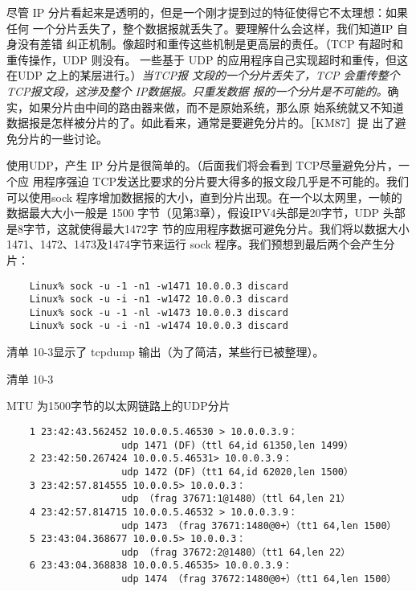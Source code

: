 尽管 IP 分片看起来是透明的，但是一个刚才提到过的特征使得它不太理想：如果任何
一个分片丢失了，整个数据报就丢失了。要理解什么会这样，我们知道IP 自身没有差错
纠正机制。像超时和重传这些机制是更高层的责任。（TCP 有超时和重传操作，UDP 则没有。
一些基于 UDP 的应用程序自己实现超时和重传，但这在UDP 之上的某层进行。）\emph{当TCP报
  文段的一个分片丢失了，TCP 会重传整个 TCP报文段，这涉及整个 IP数据报。只重发数据
报的一个分片是不可能的。}确实，如果分片由中间的路由器来做，而不是原始系统，那么原
始系统就又不知道数据报是怎样被分片的了。如此看来，通常是要避免分片的。［KM87］提
出了避免分片的一些讨论。

使用UDP，产生 IP 分片是很简单的。（后面我们将会看到 TCP尽量避免分片，一个应
用程序强迫 TCP发送比要求的分片要大得多的报文段几乎是不可能的。我们可以使用sock
程序增加数据报的大小，直到分片出现。在一个以太网里，一帧的数据最大大小一般是 1500
字节（见第3章），假设IPV4头部是20字节，UDP 头部是8字节\footnotemark，这就使得最大1472字
节的应用程序数据可避免分片。我们将以数据大小 1471、1472、1473及1474字节来运行
sock 程序。我们预想到最后两个会产生分片：

\begin{verbatim}
    Linux% sock -u -1 -n1 -w1471 10.0.0.3 discard
    Linux% sock -u -i -n1 -w1472 10.0.0.3 discard
    Linux% sock -u -1 -nl -w1473 10.0.0.3 discard
    Linux% sock -u -i -n1 -w1474 10.0.0.3 discard
\end{verbatim}

清单 10-3显示了 tcpdump 输出（为了简洁，某些行已被整理）。

清单 10-3

MTU 为1500字节的以太网链路上的UDP分片

\begin{verbatim}
    1 23:42:43.562452 10.0.0.5.46530 > 10.0.0.3.9：
                    udp 1471 (DF)（ttl 64,id 61350,len 1499）
    2 23:42:50.267424 10.0.0.5.46531> 10.0.0.3.9：
                    udp 1472 (DF)（tt1 64,id 62020,len 1500）
    3 23:42:57.814555 10.0.0.5> 10.0.0.3：
                    udp （frag 37671:1@1480）（ttl 64,len 21）
    4 23:42:57.814715 10.0.0.5.46532 > 10.0.0.3.9：
                    udp 1473 （frag 37671:1480@0+）（tt1 64,len 1500）
    5 23:43:04.368677 10.0.0.5> 10.0.0.3：
                    udp （frag 37672:2@1480）（tt1 64,len 22）
    6 23:43:04.368838 10.0.0.5.46535> 10.0.0.3.9：
                    udp 1474 （frag 37672:1480@0+）（tt1 64,len 1500）
\end{verbatim}



